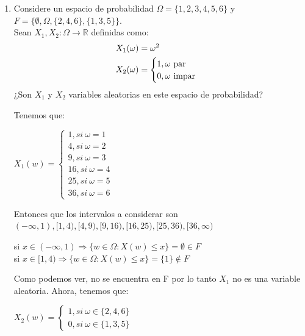 \documentclass[12pt,a4paper]{report}
\begin{document}
\begin{enumerate}
{		}

		\item {
			Considere un espacio de probabilidad $\Omega = \{1, 2, 3, 4, 5, 6\}$ y
			$F = \{\emptyset, \Omega, \{2, 4, 6\}, \{1, 3, 5\}\}$.\\
			Sean $X_1, X_2 : \Omega \rightarrow \mathbb{R}$ definidas como:
			\begin{align*}
				X_1(\omega) &= \omega^2\\
				X_2(\omega) &= \begin{cases}																						1, \omega $ par$\\																			0, \omega $ impar$																			\end{cases}
			\end{align*}
			¿Son $X_1$ y $X_2$ variables aleatorias en este espacio de probabilidad?

			Tenemos que: \\
			\begin{center}
			    $X_{1}(w)= \begin{cases} 1, si\ \omega=1\\ 4,si \ \omega=2 \\ 9, si \ \omega=3\\ 16, si \ \omega=4 \\ 25, si \ \omega=5 \\ 36, si \ \omega=6  \end{cases}$
			\end{center}
			Entonces que los intervalos a considerar son $(-\infty,1),[1,4),[4,9),[9,16),[16,25),[25,36),[36,\infty)$\\
			\begin{center}
			    si $x\in (-\infty,1) \Rightarrow \lbrace w\in \Omega : X(w)\leq x \rbrace = \emptyset \in F $ \\
			    si $x\in [1,4) \Rightarrow \lbrace w \in \Omega : X(w) \leq x \rbrace = \lbrace 1 \rbrace \notin F$
			\end{center}
			Como podemos ver, no se encuentra en F por lo tanto  $X_{1}$ no es una variable aleatoria. Ahora, tenemos que:\\
			\begin{center}
			    $X_{2}(w) = \begin{cases}
			    1, si \ \omega \in \lbrace 2,4,6 \rbrace \\
			    0, si \ \omega \in \lbrace 1,3,5 \rbrace
			    \end{cases}$
			\end{center}

}
\end{enumerate}
\end{document}
